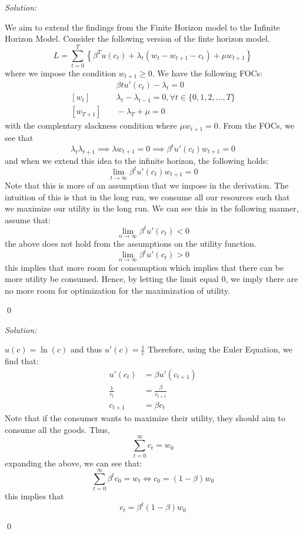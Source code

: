 \documentclass[12pt]{article}
\newenvironment{problem}[2][Problem]{\begin{trivlist}
\item[\hskip \labelsep {\bfseries #1}\hskip \labelsep {\bfseries #2.}]}{\end{trivlist}}
\newcounter{subproblem}
\renewcommand{\thesubproblem}{\arabic{subproblem}} %
\newenvironment{subprob}[1][]{
  \refstepcounter{subproblem}
  \begin{trivlist}
  \item[\hskip \labelsep {\bfseries (\thesubproblem)}]
}{
  \end{trivlist}
}
\newenvironment{subsol}
    {\emph{Solution:}
    }
    {
    \qed
    }
\begin{document}
\begin{subsol}
    We aim to extend the findings from the Finite Horizon model to the Infinite Horizon Model. Consider the following version of the finte horizon model. 
    \[
    L = \sum_{t = 0}^{T} \left \{ \beta^T u(c_t) + \lambda_t (w_t - w_{t+1} - c_t) + \mu w_{t+1}\right\}
    \]
    where we impose the condition $w_{t+1} \geq 0$. We have the following FOCs:
    \begin{align*}
        [c_t] & \quad \beta t u'(c_t) - \lambda_t = 0\\
        [w_t] & \quad \lambda_t - \lambda_{t-1} = 0, \forall t \in \{0,1,2, \dots, T\}\\
        [w_{T+1}] & \quad -\lambda_T + \mu = 0
    \end{align*}
    with the complentary slackness condition where $\mu w_{t+1} = 0$. From the FOCs, we see that 
    \[
    \lambda_t \lambda_{t+1} \implies \lambda w_{t+1} = 0 \implies \beta^t u'(c_t) w_{t+1} = 0 
    \]
    and when we extend this idea to the infinite horizon, the following holds:
    \[
    \lim_{t \to \infty} \beta^t u'(c_t) w_{t+1} = 0
    \]
    Note that this is more of an assumption that we impose in the derivation. The intuition of this is that in the long run, we consume all our resources such that we maximize our utility in the long run.  We can see this in the following manner, assume that:
    \[
    \lim_{n \to \infty} \beta^t u'(c_t) < 0
    \]
    the above does not hold from the assumptions on the utility function. 
    \[
        \lim_{n \to \infty} \beta^t u'(c_t) > 0
    \]
    this implies that more room for consumption which implies that there can be more utility be consumed. Hence, by letting the limit equal 0, we imply there are no more room for optimization for the maximization of utility. 
\end{subsol}
\begin{subprob}
\end{subprob}
\begin{subsol}
    $u(c) = \ln (c)$ and thus $u'(c) = \frac{1}{c}$ Therefore, using the Euler Equation, we find that:
    \begin{align*}
        u'(c_t) &= \beta u'(c_{t+1})\\
        \frac{1}{c_t} &= \frac{\beta}{c_{t+1}}\\
        c_{t+1} &= \beta c_t
    \end{align*}
    Note that if the consumer wants to maximize their utility, they should aim to consume all the goods. Thus, 
    \[
    \sum_{t = 0}^{\infty} c_t = w_0
    \]
    expanding the above, we can see that: 
    \[
    \sum_{t = 0 }^{\infty} \beta^t c_0 = w_t \iff c_0 = (1-\beta)w_0 
    \] 
    this implies that 
    \[
    c_t = \beta^t (1-\beta)w_0
    \]
\end{subsol}
\begin{problem}{2}
    
\end{problem}
\begin{problem}{3}
    
\end{problem}
\end{document}
